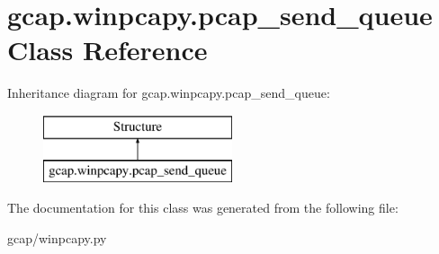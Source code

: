 \hypertarget{classgcap_1_1winpcapy_1_1pcap__send__queue}{}\section{gcap.\+winpcapy.\+pcap\+\_\+send\+\_\+queue Class Reference}
\label{classgcap_1_1winpcapy_1_1pcap__send__queue}
Inheritance diagram for gcap.\+winpcapy.\+pcap\+\_\+send\+\_\+queue\+:\begin{figure}[H]
\begin{center}
\leavevmode
\includegraphics[height=2.000000cm]{d4/d76/classgcap_1_1winpcapy_1_1pcap__send__queue}
\end{center}
\end{figure}


The documentation for this class was generated from the following file\+:\begin{DoxyCompactItemize}
\item 
gcap/winpcapy.\+py\end{DoxyCompactItemize}
